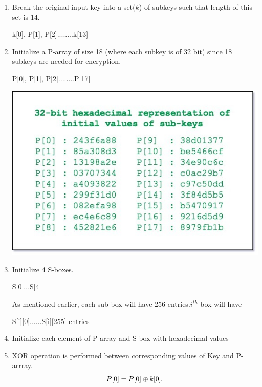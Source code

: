\documentclass[a4paper]{report} %
\begin{document}
\begin{enumerate}
    \item Break the original input key into a set($k$) of subkeys such that length of this set is 14.
    \begin{center}
        k[0], P[1], P[2]........k[13]

    \end{center}
    \item Initialize a P-array of size 18 (where each subkey is of 32 bit) since 18 subkeys are needed for encryption.
    \begin{center}
        P[0], P[1], P[2]........P[17]
    \end{center}
    \includegraphics[scale=0.5]{images/Parray.jpg}
    \item Initialize 4 S-boxes. \\
    \begin{center}
        S[0]...S[4]
    \end{center}
    As mentioned earlier, each sub box will have 256 entries.$i^{th}$ box will have\\
    \begin{center}
        S[i][0]......S[i][255] entries
    \end{center}
    \item Initialize each element of P-array and S-box with hexadecimal values
    \item XOR operation is performed between corresponding values of Key and P-arrray.\\
    \begin{equation*}
        P[0]=P[0] \oplus k[0]\\
        .\\

\end{equation*}
\end{enumerate}
\end{document}
